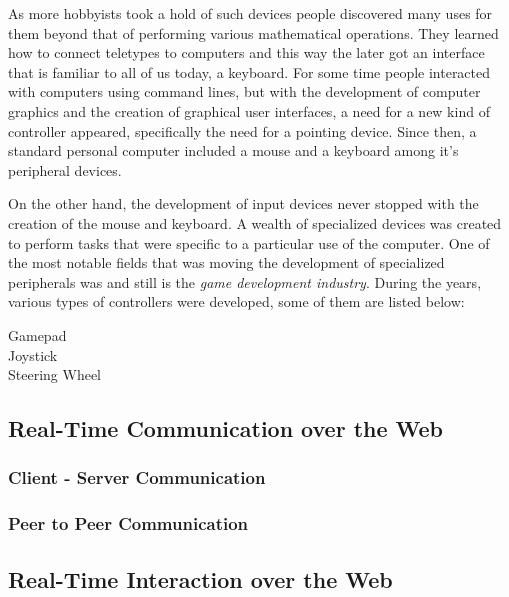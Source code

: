 
As more hobbyists took a hold of such devices people discovered many uses for them beyond that of performing various mathematical operations. They learned how to connect teletypes to computers and this way the later got an interface that is familiar to all of us today, a keyboard. For some time people interacted with computers using command lines, but with the development of computer graphics and the creation of graphical user interfaces, a need for a new kind of controller appeared, specifically the need for a pointing device. Since then, a standard personal computer included a mouse and a keyboard among it's peripheral devices.

On the other hand, the development of input devices never stopped with the creation of the mouse and keyboard. A wealth of specialized devices was created to perform tasks that were specific to a particular use of the computer. One of the most notable fields that was moving the development of specialized peripherals was and still is the \emph{game development industry}. During the years, various types of controllers were developed, some of them are listed below:

\begin{description}
	\item [Gamepad]
	\item [Joystick]
	\item [Steering Wheel]
\end{description}

\subsection{Real-Time Communication over the Web} %

\subsubsection{Client - Server Communication} %

\subsubsection{Peer to Peer Communication} %


\subsection{Real-Time Interaction over the Web} %

